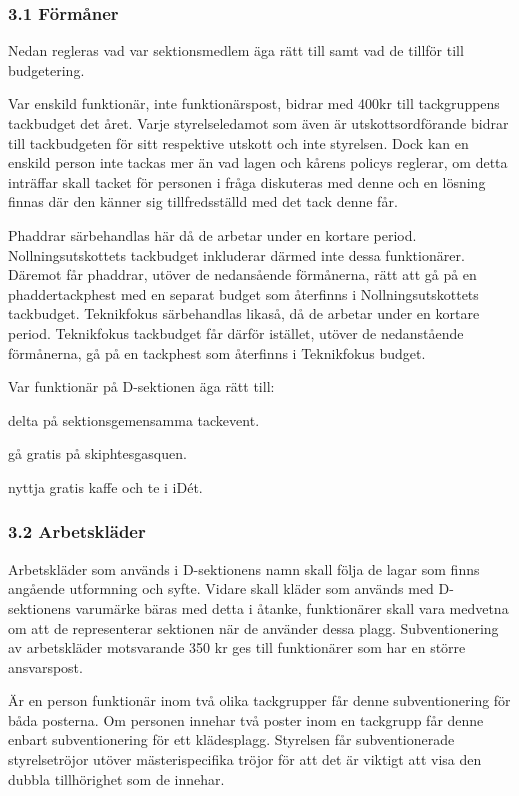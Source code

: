 \documentclass{dsekkallelse}
\begin{document}
\subsubsection{3.1 Förmåner}
\par Nedan regleras vad var sektionsmedlem äga rätt till samt vad de tillför till budgetering.
\par Var enskild funktionär, inte funktionärspost, bidrar med 400kr till tackgruppens tackbudget det året. Varje styrelseledamot som även är utskottsordförande bidrar till tackbudgeten för sitt respektive utskott och inte styrelsen. Dock kan en enskild person inte tackas mer än vad lagen och kårens policys reglerar, om detta inträffar skall tacket för personen i fråga diskuteras med denne och en lösning finnas där den känner sig tillfredsställd med det tack denne får.
\par Phaddrar särbehandlas här då de arbetar under en kortare period. Nollningsutskottets tackbudget inkluderar därmed inte dessa funktionärer. Däremot får phaddrar, utöver de nedansående förmånerna, rätt att gå på en phaddertackphest med en separat budget som återfinns i Nollningsutskottets tackbudget. Teknikfokus särbehandlas likaså, då de arbetar under en kortare period. Teknikfokus tackbudget får därför istället, utöver de nedanstående förmånerna, gå på en tackphest som återfinns i Teknikfokus budget.

Var funktionär på D-sektionen äga rätt till:
\begin{attlista}
  \item delta på sektionsgemensamma tackevent.
  \item gå gratis på skiphtesgasquen.
  \item nyttja gratis kaffe och te i iDét.
\end{attlista}

\subsubsection{3.2 Arbetskläder}
\par Arbetskläder som används i D-sektionens namn skall följa de lagar som finns angående utformning och syfte. Vidare skall kläder som används med D-sektionens varumärke bäras med detta i åtanke, funktionärer skall vara medvetna om att de representerar sektionen när de använder dessa plagg.
Subventionering av arbetskläder motsvarande 350 kr ges till funktionärer som har en större ansvarspost.

\par Är en person funktionär inom två olika tackgrupper får denne subventionering för båda posterna. Om personen innehar två poster inom en tackgrupp får denne enbart subventionering för ett klädesplagg. Styrelsen får subventionerade styrelsetröjor utöver mästerispecifika tröjor för att det är viktigt att visa den dubbla tillhörighet som de innehar.
\end{document}
